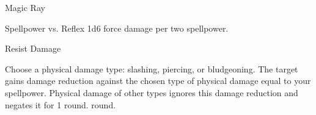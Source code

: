 \begin{spellsection}{Magic Ray}
    \begin{spellheader}
    \end{spellheader}
    \begin{spellcontent}
        \begin{spelltargetinginfo}
        \end{spelltargetinginfo}
        \begin{spelleffects}
            \begin{spellattack}{Spellpower vs. Reflex}
                \spellsuccess 1d6 force damage  per two spellpower.
            \end{spellattack}
        \end{spelleffects}
    \end{spellcontent}
    \begin{spellfooter}
        \spellnotes \forcespellnotes
    \end{spellfooter}
\end{spellsection}

\begin{spellsection}{Resist Damage}
    \begin{spellheader}
    \end{spellheader}
    \begin{spellcontent}
        \begin{spelltargetinginfo}
        \end{spelltargetinginfo}
        \begin{spelleffects}
            \spellspecial Choose a physical damage type: slashing, piercing, or bludgeoning.
            \spelleffect The target gains damage reduction against the chosen type of physical damage equal to your spellpower. Physical damage of other types ignores this damage reduction and negates it for 1 round.
             round.
        \end{spelleffects}
    \end{spellcontent}
    \begin{spellfooter}
    \end{spellfooter}
\end{spellsection}

